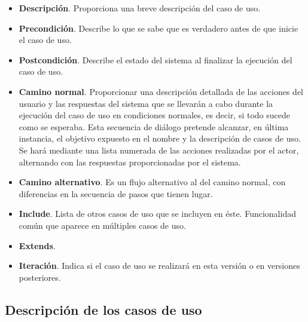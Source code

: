 \documentclass[a4paper,oneside,11pt]{book}
\begin{document}
\begin{itemize}
				\item \textbf{Descripción}. Proporciona una breve descripción del caso de uso.
				
				\item \textbf{Precondición}. Describe lo que se sabe que es verdadero antes de que inicie el caso de uso. 
				
				\item \textbf{Postcondición}. Describe el estado del sistema al finalizar la ejecución del caso de uso.
				
				\item \textbf{Camino normal}. Proporcionar una descripción detallada de las acciones del usuario y las respuestas del sistema que se llevarán a cabo durante la ejecución del caso de uso en condiciones normales, es decir, si todo sucede como se esperaba. Esta secuencia de diálogo pretende alcanzar, en última instancia, el objetivo expuesto en el nombre y la descripción de casos de uso. Se hará mediante una lista numerada de las acciones realizadas por el actor, alternando con las respuestas proporcionadas por el sistema.
				
				\item \textbf{Camino alternativo}. Es un flujo alternativo al del camino normal, con diferencias en la secuencia de pasos que tienen lugar. 
				
				\item \textbf{Include}. Lista de otros casos de uso que se incluyen en éste. Funcionalidad común que aparece en múltiples casos de uso.
				
				\item \textbf{Extends}. 
				
				\item \textbf{Iteración}. Indica si el caso de uso se realizará en esta versión o en versiones posteriores.
		
			\end{itemize}
		
		
		\subsection{Descripción de los casos de uso} %
		\label{sub:descripcion_de_los_casos_de_uso}
		
\end{document}

